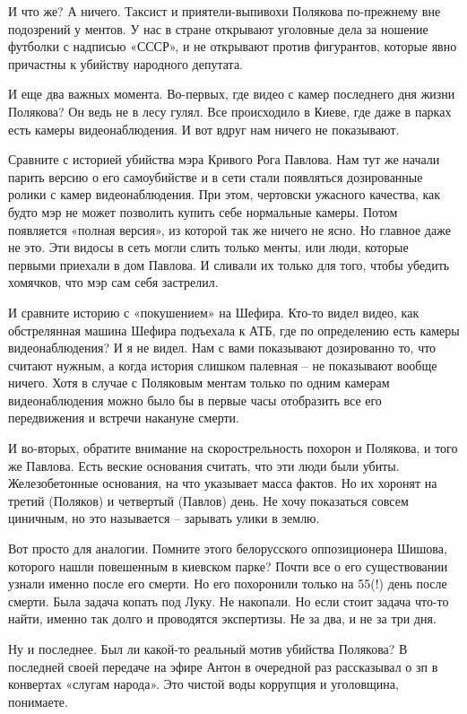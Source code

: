 И что же? А ничего. Таксист и приятели-выпивохи Полякова по-прежнему вне
подозрений у ментов. У нас в стране открывают уголовные дела за ношение
футболки с надписью «СССР», и не открывают против фигурантов, которые явно
причастны к убийству народного депутата.

И еще два важных момента. Во-первых, где видео с камер последнего дня жизни
Полякова? Он ведь не в лесу гулял. Все происходило в Киеве, где даже в парках
есть камеры видеонаблюдения. И вот вдруг нам ничего не показывают.

Сравните с историей убийства мэра Кривого Рога Павлова. Нам тут же начали
парить версию о его самоубийстве и в сети стали появляться дозированные ролики
с камер видеонаблюдения. При этом, чертовски ужасного качества, как будто мэр
не может позволить купить себе нормальные камеры. Потом появляется «полная
версия», из которой так же ничего не ясно. Но главное даже не это. Эти видосы в
сеть могли слить только менты, или люди, которые первыми приехали в дом
Павлова. И сливали их только для того, чтобы убедить хомячков, что мэр сам себя
застрелил.

И сравните историю с «покушением» на Шефира. Кто-то видел видео, как
обстрелянная машина Шефира подъехала к АТБ, где по определению есть камеры
видеонаблюдения? И я не видел. Нам с вами показывают дозированно то, что
считают нужным, а когда история слишком палевная – не показывают вообще ничего.
Хотя в случае с Поляковым ментам только по одним камерам видеонаблюдения можно
было бы в первые часы отобразить все его передвижения и встречи накануне
смерти.

И во-вторых, обратите внимание на скорострельность похорон и Полякова, и того
же Павлова. Есть веские основания считать, что эти люди были убиты.
Железобетонные основания, на что указывает масса фактов. Но их хоронят на
третий (Поляков) и четвертый (Павлов) день. Не хочу показаться совсем циничным,
но это называется – зарывать улики в землю.

Вот просто для аналогии. Помните этого белорусского оппозиционера Шишова,
которого нашли повешенным в киевском парке? Почти все о его существовании
узнали именно после его смерти. Но его похоронили только на 55(!) день после
смерти. Была задача копать под Луку. Не накопали. Но если стоит задача что-то
найти, именно так долго и проводятся экспертизы. Не за два, и не за три дня.

Ну и последнее. Был ли какой-то реальный мотив убийства Полякова? В последней
своей передаче на эфире Антон в очередной раз рассказывал о зп в конвертах
«слугам народа». Это чистой воды коррупция и уголовщина, понимаете.

